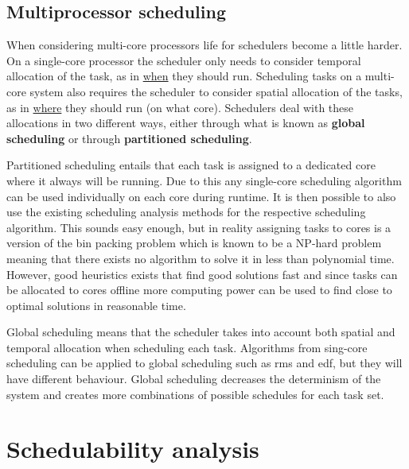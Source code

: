\documentclass{kththesis}
\begin{document}
\subsection{Multiprocessor scheduling} \label{subsec:multiprocessor_scheduling}

When considering multi-core processors life for schedulers become a little harder. On a single-core
processor the scheduler only needs to consider temporal allocation of the task, as in
\underline{when} they should run. Scheduling tasks on a multi-core system also requires the
scheduler to consider spatial allocation of the tasks, as in \underline{where} they should run
(on what core). Schedulers deal with these allocations in two different ways, either through what is
known as \textbf{global scheduling} or through \textbf{partitioned scheduling}. 

Partitioned scheduling entails that each task is assigned to a dedicated core where it always will
be running. Due to this any single-core scheduling algorithm can be used individually on each core
during runtime. It is then possible to also use the existing scheduling analysis methods for the
respective scheduling algorithm.  This sounds easy enough, but in reality assigning tasks to cores
is a version of the bin packing problem which is known to be a NP-hard problem meaning that there
exists no algorithm to solve it in less than polynomial time. However, good heuristics
\parencite{johnson_fast_1974}\parencite{coffman_application_1978} exists that find good solutions
fast and since tasks can be allocated to cores offline more computing power can be used to find
close to optimal solutions in reasonable time.

Global scheduling means that the scheduler takes into account both spatial and temporal allocation
when scheduling each task. Algorithms from sing-core scheduling can be applied to global scheduling
such as \acrshort{rms} and \acrshort{edf}, but they will have different behaviour. Global scheduling
decreases the determinism of the system and creates more combinations of possible schedules for each
task set.

\section{Schedulability analysis}
\end{document}
